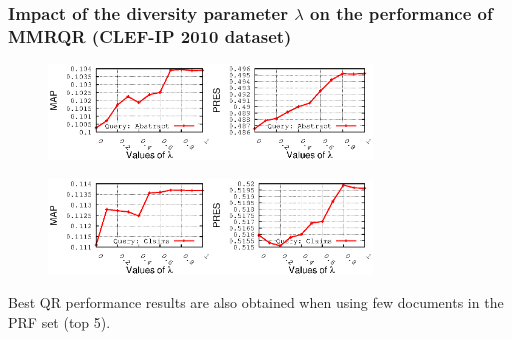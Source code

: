 \documentclass[xcolor=x11names,compress]{beamer}
\renewcommand{\(}{\begin{columns}}
\renewcommand{\)}{\end{columns}}
\newcommand{\<}[1]{\begin{column}{#1}}
\renewcommand{\>}{\end{column}}
\begin{document}
\begin{frame}
\frametitle{Impact of the diversity parameter $\lambda$ on the performance of MMRQR (CLEF-IP 2010 dataset)}


\begin{figure}
\begin{centering}
\includegraphics[width=4.3cm]{../mmrqrResults-lambda/qAbstract-sDescription_MAP_2010}\includegraphics[width=4.3cm]{../mmrqrResults-lambda/qAbstract-sDescription_PRES_2010}
\par\end{centering}

\begin{centering}
\includegraphics[width=4.3cm]{../mmrqrResults-lambda/qClaims-sDescription_MAP_2010}\includegraphics[width=4.3cm]{../mmrqrResults-lambda/qClaims-sDescription_PRES_2010}
\par\end{centering}
\end{figure}

{\small Best QR performance results are also obtained when using few documents in the PRF set (top 5).}
\end{frame}
\end{document}
